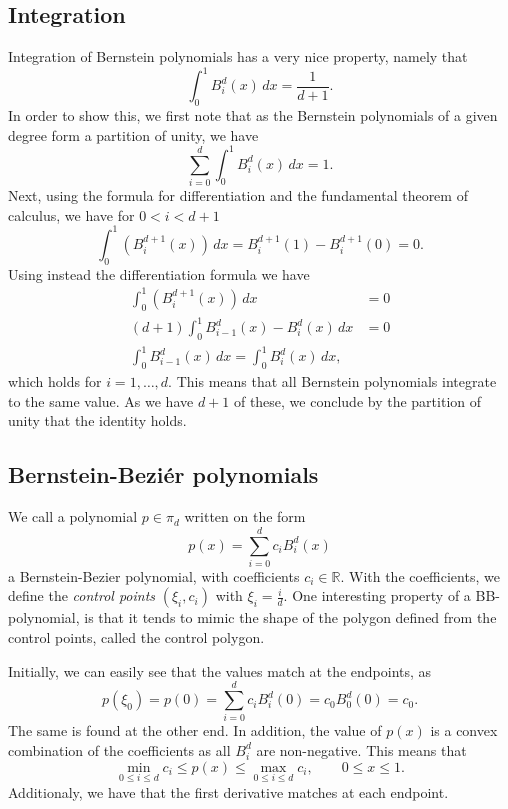 \subsection{Integration}
Integration of Bernstein polynomials has a very nice property, namely that
\begin{equation}
    \int_{0}^{1} B_i^d(x) \, dx = \frac{1}{d + 1}.
\end{equation}
In order to show this, we first note that as the Bernstein polynomials of a given degree form a partition of unity, we have
\begin{equation}
    \sum_{i = 0}^{d} \int_{0}^{1} B_i^d(x) \, dx = 1.
\end{equation}
Next, using the formula for differentiation and the fundamental theorem of calculus, we have for $0 < i < d + 1$
\begin{equation}
    \int_{0}^{1} (B_i^{d+1}(x)) \, dx = B_i^{d+1}(1) - B_i^{d+1}(0) = 0.
\end{equation}
Using instead the differentiation formula we have
\begin{align*}
    \int_{0}^{1} (B_i^{d+1}(x)) \, dx &= 0 \\
    (d + 1) \int_{0}^{1} B_{i - 1}^{d}(x) - B_i^d(x) \, dx &= 0 \\
    \int_{0}^{1} B_{i - 1}^{d}(x) \, dx = \int_{0}^{1} B_{i}^{d}(x) \, dx,
\end{align*}
which holds for $i = 1, \dots, d$.
This means that all Bernstein polynomials integrate to the same value.
As we have $d + 1$ of these, we conclude by the partition of unity that the identity holds.

\subsection{Bernstein-Beziér polynomials}
We call a polynomial $p \in \pi_d$ written on the form
\begin{equation}
    p(x) = \sum_{i = 0}^{d} c_i B_i^d(x)
\end{equation}
a Bernstein-Bezier polynomial, with coefficients $c_i \in \mathbb{R}$.
With the coefficients, we define the \textit{control points} $(\xi_i, c_i)$ with $\xi_i = \frac{i}{d}$.
One interesting property of a BB-polynomial, is that it tends to mimic the shape of the polygon defined from the control points, called the control polygon.

Initially, we can easily see that the values match at the endpoints, as
\begin{equation}
    p(\xi_0) = p(0) = \sum_{i = 0}^{d} c_i B_i^d(0) = c_0 B_0^d(0) = c_0.
\end{equation}
The same is found at the other end.
In addition, the value of $p(x)$ is a convex combination of the coefficients as all $B_i^d$ are non-negative.
This means that
\begin{equation}
    \min_{0 \leq i \leq d} c_i \leq p(x) \leq \max_{0 \leq i \leq d} c_i,
    \qquad 0 \leq x \leq 1.
\end{equation}
Additionaly, we have that the first derivative matches at each endpoint.

